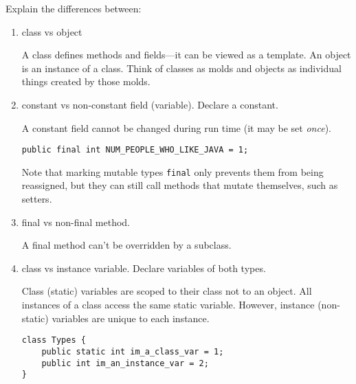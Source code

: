 Explain the differences between:
\begin{enumerate}
	\item class vs object \\
	\begin{answer}
	A class defines methods and fields---it can be viewed as a template. An object is an instance of a class. Think of classes as molds and objects as individual things created by those molds.
	\end{answer}	
	
	\item constant vs non-constant field (variable).  Declare a constant. \\
	\begin{answer}
	A constant field cannot be changed during run time (it may be set {\em once}).
		\begin{lstlisting}[numbers=none]
public final int NUM_PEOPLE_WHO_LIKE_JAVA = 1;
		\end{lstlisting}
	Note that marking mutable types {\tt final} only prevents them from being reassigned, but they can still call methods that mutate themselves, such as setters.
	\end{answer}
	
	\item final vs non-final method.  \\
	\begin{answer}
	A final method can't be overridden by a subclass.
	\end{answer}

	\item class vs instance variable.  Declare variables of both types.\\
	\begin{answer}
	Class (static) variables are scoped to their class not to an object.  All instances of a class access the same static variable.  However, instance (non-static) variables are unique to each instance.
		\begin{lstlisting}[numbers=none]
class Types {
	public static int im_a_class_var = 1;
	public int im_an_instance_var = 2;
}
		\end{lstlisting}
	\end{answer}
	
\end{enumerate}
